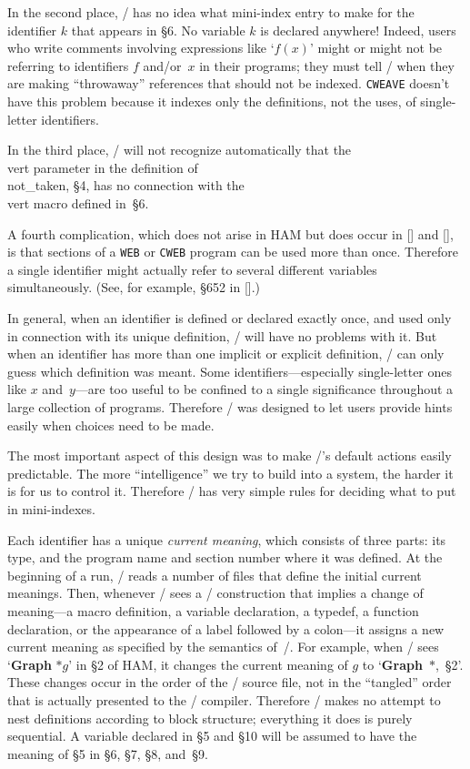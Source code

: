 In the second place, \CTWILL/ has no idea what mini-index entry to make for
the identifier $k$ that appears in \S6. No variable $k$ is declared
anywhere! Indeed, users who write comments involving
expressions like `$f(x)$' might or might not be referring to identifiers
$f$ and/or~$x$ in their programs; they must tell \CTWILL/ when they are
making ``throwaway'' references that should not be indexed. {\tt CWEAVE}
doesn't have this problem because it indexes only the definitions, not the
uses, of single-letter identifiers.

In the third place, \CTWILL/ will not recognize automatically that the
\\{vert} parameter in the definition of \\{not\_taken}, \S4, has no
connection with the \\{vert} macro defined in~\S6.

A fourth complication, which does not arise in {\sc HAM} but does occur
in [\TTP] and [\SGB], is that sections of a {\tt WEB} or {\tt CWEB} program
can be used more than once. Therefore a single
identifier might actually refer to several different variables
simultaneously. (See, for example, \S652 in [\TTP].)

In general, when an identifier is defined or declared exactly once, and
used only in connection with its unique definition, \CTWILL/ will have no
problems with it. But when an identifier has more than one implicit or
explicit definition, \CTWILL/ can only guess which definition was meant.
Some identifiers---especially single-letter ones like $x$ and~$y$---are too
useful to be confined to a single significance throughout a large
collection of programs. Therefore \CTWILL/ was designed to let users
provide hints easily when choices need to be made.

The most important aspect of this design was to make \CTWILL/'s default
actions easily predictable. The more ``intelligence'' we try to build into
a system, the harder it is for us to control it. Therefore \CTWILL/ has
very simple rules for deciding what to put in mini-indexes.

Each identifier has a unique {\em current meaning}, which consists of three
parts: its type, and the program name and section number where it was
defined. At the beginning of a run, \CTWILL/ reads a number of
files that define the
initial current meanings. Then, whenever \CTWILL/
 sees a \CEE/ construction that
implies a change of meaning---a macro definition, a variable declaration, a
typedef, a function declaration, or the appearance of a label followed by a
colon---it assigns a new current meaning as specified by the semantics
of~\CEE/. For example, when \CTWILL/ sees `{\bf Graph} $*g$' in \S2 of {\sc
HAM}, it changes the current meaning of $g$ to `{\bf Graph}~$*$,~\S2'.
These changes occur in the order of the \CWEB/ source file, not in the
``tangled'' order that is actually presented to the \CEE/ compiler.
Therefore \CTWILL/ makes no attempt to nest definitions according to block
structure; everything it does is purely sequential. A variable declared in
\S5 and \S10 will be assumed to have the meaning of \S5 in \S6, \S7, \S8,
and~\S9.

